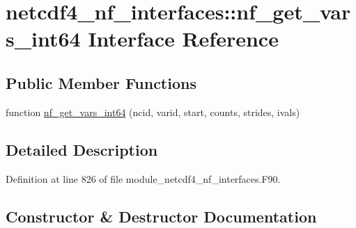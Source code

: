 \hypertarget{interfacenetcdf4__nf__interfaces_1_1nf__get__vars__int64}{}\section{netcdf4\+\_\+nf\+\_\+interfaces\+:\+:nf\+\_\+get\+\_\+vars\+\_\+int64 Interface Reference}
\label{interfacenetcdf4__nf__interfaces_1_1nf__get__vars__int64}
\subsection*{Public Member Functions}
\begin{DoxyCompactItemize}
\item 
function \hyperlink{interfacenetcdf4__nf__interfaces_1_1nf__get__vars__int64_a4dcebded2ec7f1972b56853e4ae00d76}{nf\+\_\+get\+\_\+vars\+\_\+int64} (ncid, varid, start, counts, strides, ivals)
\end{DoxyCompactItemize}


\subsection{Detailed Description}


Definition at line 826 of file module\+\_\+netcdf4\+\_\+nf\+\_\+interfaces.\+F90.



\subsection{Constructor \& Destructor Documentation}
\mbox{\label{interfacenetcdf4__nf__interfaces_1_1nf__get__vars__int64_a4dcebded2ec7f1972b56853e4ae00d76}} 
